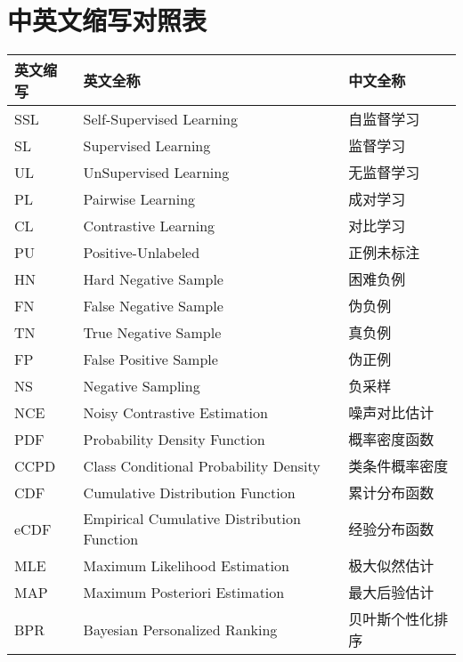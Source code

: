 \chapter*{中英文缩写对照表}
\begin{center} \xiaosi
\vspace{2.0cm}
\renewcommand{\arraystretch}{1.5}
\begin{longtable}{|l|l|l|}
\hline
\textbf{英文缩写}& \textbf{英文全称}&\textbf{中文全称} \\\hline
SSL&Self-Supervised Learning& 自监督学习  \\\hline
SL&Supervised Learning & 监督学习\\\hline
UL&UnSupervised Learning& 无监督学习\\\hline
PL&Pairwise Learning&  成对学习\\\hline
CL&Contrastive Learning & 对比学习 \\\hline
PU&Positive-Unlabeled& 正例未标注 \\\hline
HN&Hard Negative Sample&困难负例\\\hline
FN&False Negative Sample& 伪负例 \\\hline
TN&True Negative Sample& 真负例 \\\hline
FP&False Positive Sample& 伪正例 \\\hline
NS&Negative Sampling& 负采样 \\\hline
NCE&Noisy Contrastive Estimation& 噪声对比估计 \\\hline
PDF&Probability Density Function&  概率密度函数\\\hline
CCPD&Class Conditional Probability Density& 类条件概率密度 \\\hline
CDF&Cumulative Distribution Function&累计分布函数 \\\hline
eCDF&Empirical Cumulative Distribution Function& 经验分布函数 \\\hline
MLE&Maximum Likelihood Estimation& 极大似然估计 \\\hline
MAP& Maximum Posteriori Estimation&最大后验估计 \\\hline
BPR&Bayesian Personalized Ranking&  贝叶斯个性化排序\\\hline
\end{longtable}
\end{center}  